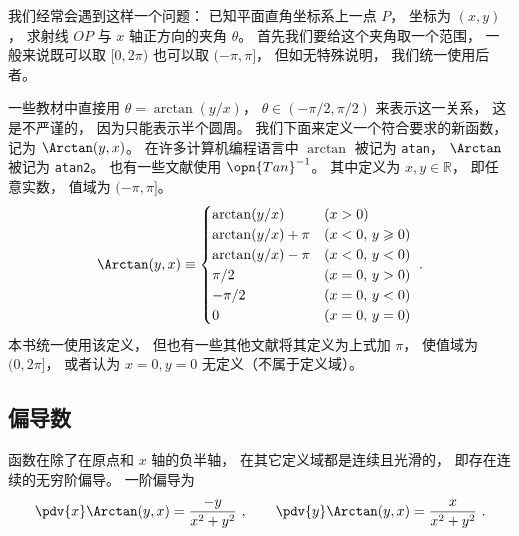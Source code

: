 

我们经常会遇到这样一个问题： 已知平面直角坐标系上一点 $P$， 坐标为 $(x, y)$， 求射线 $OP$ 与 $x$ 轴正方向的夹角 $\theta$。%
首先我们要给这个夹角取一个范围， 一般来说既可以取 $[0, 2\pi)$ 也可以取 $(-\pi, \pi]$， 但如无特殊说明， 我们统一使用后者。

一些教材中直接用 $\theta = \arctan(y/x)$， $\theta \in (-\pi/2, \pi/2)$ 来表示这一关系， 这是不严谨的， 因为只能表示半个圆周。 我们下面来定义一个符合要求的新函数， 记为 $\Arctan(y, x)$。 在许多计算机编程语言中 $\arctan$ 被记为 \lstinline|atan|， $\Arctan$ 被记为 \lstinline|atan2|。 也有一些文献使用 $\opn{Tan}^{-1}$。 其中定义为 $x, y \in \mathbb R$， 即任意实数， 值域为 $(-\pi, \pi]$。
\begin{equation}\label{eq_Arctan_1}
\Arctan(y,x) \equiv 
\begin{cases}
\arctan (y/x) \quad &(x > 0)\\
\arctan (y/x) + \pi  &(x < 0,\,y \geqslant 0)\\
\arctan (y/x) - \pi  &(x < 0,\,y < 0)\\
\pi /2  &(x = 0, \,y > 0)\\
 -\pi /2  &(x = 0, \,y < 0)\\
0 & (x=0,\,y=0)
\end{cases}~.
\end{equation}
本书统一使用该定义， 但也有一些其他文献将其定义为上式加 $\pi$， 使值域为 $(0, 2\pi]$， 或者认为 $x = 0, y = 0$ 无定义（不属于定义域）。

\subsection{偏导数}
函数在除了在原点和 $x$ 轴的负半轴， 在其它定义域都是连续且光滑的， 即存在连续的无穷阶偏导。 一阶偏导为
\begin{equation}
\pdv{x} \Arctan(y, x) = \frac{-y}{x^2 + y^2} ~,\qquad
\pdv{y} \Arctan(y, x) = \frac{x}{x^2 + y^2}~.
\end{equation}
